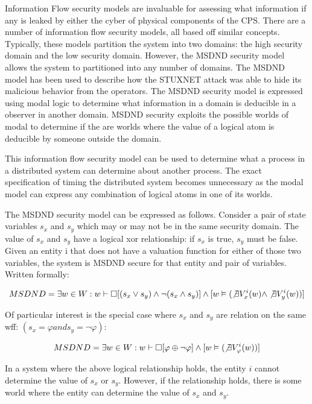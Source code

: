 \documentclass[12pt,oneside]{article}
\begin{document}
Information Flow security models are invaluable for assessing what information if any is leaked by either the cyber of physical components of the CPS. There are a number of information flow security models, all based off similar concepts. Typically, these models partition the system into two domains: the high security domain and the low security domain. However, the MSDND security model allows the system to partitioned into any number of domains. The MSDND model has been used to describe how the STUXNET attack was able to hide its malicious behavior from the operators. The MSDND security model is expressed using modal logic to determine what information in a domain is deducible in a observer in another domain. MSDND security exploits the possible worlds of modal to determine if the are worlds where the value of a logical atom is deducible by someone outside the domain.

This information flow security model can be used to determine what a process in a distributed system can determine about another process. The exact specification of timing the distributed system becomes unnecessary as the modal model can express any combination of logical atoms in one of its worlds. 

The MSDND security model can be expressed as follows. Consider a pair of state variables $s_x$ and $s_y$ which may or may not be in the same security domain. The value of $s_x$ and $s_y$ have a logical xor relationship: if $s_x$ is true, $s_y$ must be false. Given an entity i that does not have a valuation function for either of those two variables, the system is MSDND secure for that entity and pair of variables. Written formally:

\begin{align}
MSDND = \exists w \in W : w \vdash \Box [ (s_x \vee s_y) \wedge \neg(s_x \wedge s_y) ] \wedge [ w \vDash ( \not \exists V_x^i (w) \wedge \not \exists V_y^i (w) ) ]
\end{align}

Of particular interest is the special case where $s_x$ and $s_y$ are relation on the same wff: $(s_x = \varphi and s_y = \neg \varphi)$:

\begin{align}
MSDND = \exists w \in W : w \vdash \Box [ \varphi \oplus \neg \varphi ] \wedge [ w \vDash ( \not \exists V_\varphi^i(w)) ]
\end{align}

In a system where the above logical relationship holds, the entity $i$ cannot determine the value of $s_x$ or $s_y$. However, if the relationship holds, there is some world where the entity can determine the value of $s_x$ and $s_y$.
\end{document}
